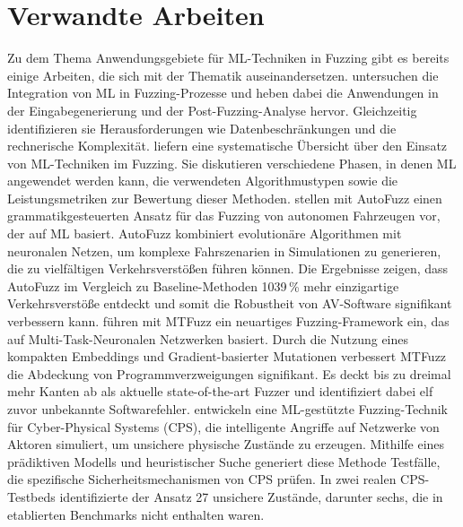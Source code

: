 
\section{Verwandte Arbeiten}\label{sec:related-work}
Zu dem Thema Anwendungsgebiete für ML-Techniken in Fuzzing gibt es bereits einige Arbeiten, die sich mit der Thematik auseinandersetzen.
\citet{saavedra_review_2019} untersuchen die Integration von ML in Fuzzing-Prozesse und heben dabei die Anwendungen in der
Eingabegenerierung und der Post-Fuzzing-Analyse hervor.
Gleichzeitig identifizieren sie Herausforderungen wie Datenbeschränkungen und die rechnerische Komplexität.\newline
\citet{wang_systematic_2020} liefern eine systematische Übersicht über den Einsatz von ML-Techniken im Fuzzing.
Sie diskutieren verschiedene Phasen, in denen ML angewendet werden kann, die verwendeten Algorithmustypen sowie die
Leistungsmetriken zur Bewertung dieser Methoden.\newline
\citet{zhong_neural_2022} stellen mit AutoFuzz einen grammatikgesteuerten Ansatz für das Fuzzing von autonomen Fahrzeugen
vor, der auf ML basiert.
AutoFuzz kombiniert evolutionäre Algorithmen mit neuronalen Netzen, um komplexe Fahrszenarien in Simulationen zu generieren,
die zu vielfältigen Verkehrsverstößen führen können.
Die Ergebnisse zeigen, dass AutoFuzz im Vergleich zu Baseline-Methoden \num{10}\text{--}\num{39}\,\unit{\percent}
mehr einzigartige Verkehrsverstöße entdeckt und somit die Robustheit von AV-Software signifikant verbessern kann.\newline
\citet{she_mtfuzz_2020} führen mit MTFuzz ein neuartiges Fuzzing-Framework ein, das auf Multi-Task-Neuronalen Netzwerken basiert.
Durch die Nutzung eines kompakten Embeddings und Gradient-basierter Mutationen verbessert MTFuzz die Abdeckung von
Programmverzweigungen signifikant.
Es deckt bis zu dreimal mehr Kanten ab als aktuelle state-of-the-art Fuzzer und identifiziert dabei elf zuvor unbekannte
Softwarefehler.\newline
\citet{chen_learning-guided_2019} entwickeln eine ML-gestützte Fuzzing-Technik für Cyber-Physical Systems (CPS), die intelligente
Angriffe auf Netzwerke von Aktoren simuliert, um unsichere physische Zustände zu erzeugen.
Mithilfe eines prädiktiven Modells und heuristischer Suche generiert diese Methode Testfälle, die spezifische
Sicherheitsmechanismen von CPS prüfen.
In zwei realen CPS-Testbeds identifizierte der Ansatz 27 unsichere Zustände, darunter sechs, die in etablierten Benchmarks
nicht enthalten waren.